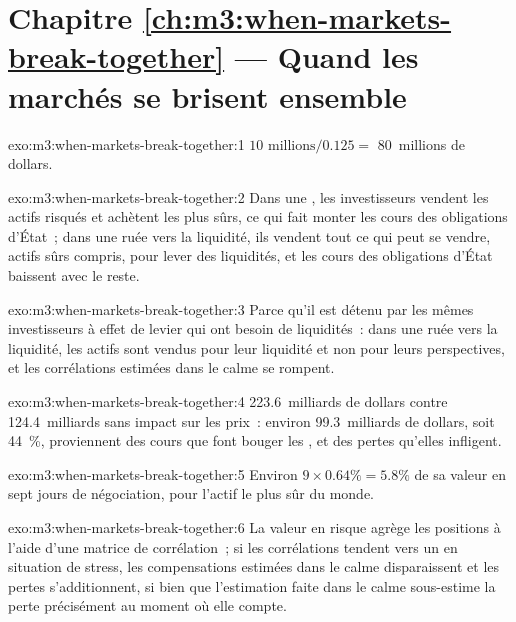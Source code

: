 \section*{Chapitre \ref{ch:m3:when-markets-break-together} --- Quand les marchés se brisent ensemble}

\begin{solution}{exo:m3:when-markets-break-together:1}
$10\text{ millions}/0.125 = $ 80~millions de dollars.
\end{solution}

\begin{solution}{exo:m3:when-markets-break-together:2}
Dans une , les investisseurs vendent les actifs risqués et achètent les plus sûrs, ce qui fait monter les cours des obligations d'État~; dans une ruée vers la liquidité, ils vendent tout ce qui peut
se vendre, actifs sûrs compris, pour lever des liquidités, et les cours des obligations d'État baissent avec le reste.
\end{solution}

\begin{solution}{exo:m3:when-markets-break-together:3}
Parce qu'il est détenu par les mêmes investisseurs à effet de levier qui ont besoin de liquidités~: dans une ruée vers la liquidité, les actifs sont vendus pour leur liquidité et non pour leurs perspectives, et
les corrélations estimées dans le calme se rompent.
\end{solution}

\begin{solution}{exo:m3:when-markets-break-together:4}
223.6~milliards de dollars contre 124.4~milliards sans impact sur les prix~: environ 99.3~milliards de dollars, soit 44~\%, proviennent des cours que font bouger les , et des pertes
qu'elles infligent.
\end{solution}

\begin{solution}{exo:m3:when-markets-break-together:5}
Environ $9 \times 0.64\% = 5.8\%$ de sa valeur en sept jours de négociation, pour l'actif le plus sûr du monde.
\end{solution}

\begin{solution}{exo:m3:when-markets-break-together:6}
La valeur en risque agrège les positions à l'aide d'une matrice de corrélation~; si les corrélations tendent vers un en situation de stress, les compensations estimées dans le calme disparaissent et les
pertes s'additionnent, si bien que l'estimation faite dans le calme sous-estime la perte précisément au moment où elle compte.
\end{solution}

